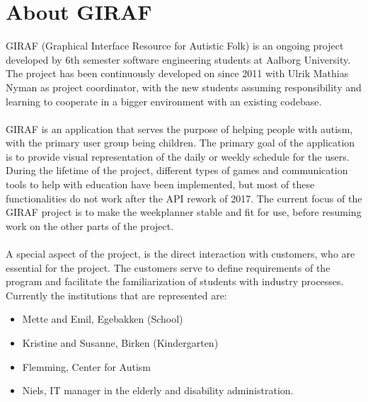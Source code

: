 \section{About GIRAF}
GIRAF (Graphical Interface Resource for Autistic Folk) is an ongoing project developed by 6th semester software engineering students at Aalborg University. 
The project has been continuously developed on since 2011 with Ulrik Mathias Nyman as project coordinator, with the new students assuming responsibility and learning to cooperate in a bigger environment with an existing codebase. 
\\\\
GIRAF is an application that serves the purpose of helping people with autism, with the primary user group being children.
The primary goal of the application is to provide visual representation of the daily or weekly schedule for the users.
During the lifetime of the project, different types of games and communication tools to help with education have been implemented, but most of these functionalities do not work after the API rework of 2017. The current focus of the GIRAF project is to make the weekplanner stable and fit for use, before resuming work on the other parts of the project. 
\\\\
A special aspect of the project, is the direct interaction with customers, who are essential for the project.
The customers serve to define requirements of the program and facilitate the familiarization of students with industry processes.
\\
\noindent
Currently the institutions that are represented are: 
\begin{itemize}
    \item Mette and Emil, Egebakken (School)
    \item Kristine and Susanne, Birken (Kindergarten)
    \item Flemming, Center for Autism
    \item Niels, IT manager in the elderly and disability administration.
\end{itemize}
